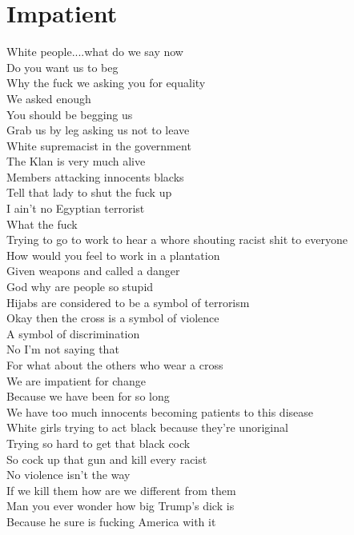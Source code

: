 \documentclass[12pt, b5paper]{article}
\begin{document}
\section{Impatient}
\par White people....what do we say now
\\Do you want us to beg
\\Why the fuck we asking you for equality
\\We asked enough
\\You should be begging us
\\Grab us by leg asking us not to leave
\\White supremacist in the government
\\The Klan is very much alive
\\Members attacking innocents blacks
\\Tell that lady to shut the fuck up
\\I ain't no Egyptian terrorist
\\What the fuck
\\Trying to go to work to hear a whore shouting racist shit to everyone
\\How would you feel to work in a plantation
\\Given weapons and called a danger
\\God why are people so stupid
\\Hijabs are considered to be a symbol of terrorism
\\Okay then the cross is a symbol of violence
\\A symbol of discrimination
\\No I'm not saying that
\\For what about the others who wear a cross
\\We are impatient for change
\\Because we have been for so long
\\We have too much innocents becoming patients to this disease
\\White girls trying to act black because they're unoriginal
\\Trying so hard to get that black cock
\\So cock up that gun and kill every racist
\\No violence isn't the way
\\If we kill them how are we different from them
\\Man you ever wonder how big Trump's dick is
\\Because he sure is fucking America with it
\end{document}
